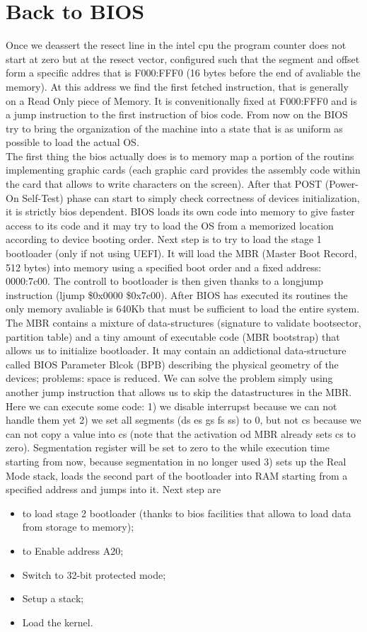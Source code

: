 \documentclass[a4paper,12pt]{article}
\begin{document}
\section{Back to BIOS}
Once we deassert the resect line in the intel cpu the program counter does not start at zero but at the resect vector, configured such that the segment and offset form a specific addres that is F000:FFF0 (16 bytes before the end of avaliable the memory). At this address we find the first fetched instruction, that is generally on a Read Only piece of Memory. It is convenitionally fixed at F000:FFF0 and is a jump instruction to the first instruction of bios code. 
From now on the BIOS try to bring the organization of the machine into a state that is as uniform as possible to load the actual OS. \\
The first thing the bios actually does is to memory map a portion of the routins implementing graphic cards (each graphic card provides the assembly code within the card that allows to write characters on the screen). After that POST (Power-On Self-Test) phase can start to simply check correctness of devices initialization, it is strictly bios dependent.  BIOS loads its own code into memory to give faster access to its code and it may try to load the OS from a memorized location according to device booting order.  Next step is to try to load the stage 1 bootloader (only if not using UEFI). It will load the MBR (Master Boot Record, 512 bytes) into memory using a specified boot order and a fixed address: 0000:7c00. The controll to bootloader is then given thanks to a longjump instruction (ljump \$0x0000 \$0x7c00). After BIOS has executed its routines the only memory avaliable is 640Kb that must be sufficient to load the entire system. 
The MBR contains a mixture of data-structures  (signature to validate bootsector, partition table) and a tiny amount of executable code (MBR bootstrap) that allows us to initialize bootloader. It may contain an addictional data-structure called BIOS Parameter Blcok (BPB) describing the physical geometry of the devices; problems: space is reduced. We can solve the problem simply using another jump instruction that allows us to skip the datastructures in the MBR. Here we can execute some code: 
1) we disable interrupst because we can not handle them yet 
2) we set all segments (ds es gs fs ss) to 0, but not cs because we can not copy a value into cs (note that the activation od MBR already sets cs to zero). Segmentation register will be set to zero to the while execution time starting from now, because segmentation in no longer used 
3) sets up the Real Mode stack, loads the second part of the bootloader into RAM starting from a specified address and jumps into it.
Next step are \begin{itemize} \item to load stage 2 bootloader (thanks to bios facilities that allowa to load data from storage to memory); \item to Enable address A20; \item Switch to 32-bit protected mode; \item Setup a stack; \item Load the kernel. \end{itemize}
\end{document}
